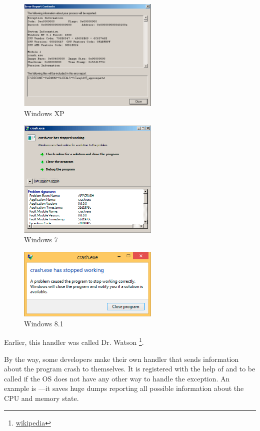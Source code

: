 \begin{figure}[H]
\centering
\includegraphics[width=0.6\textwidth]{OS/SEH/1/crash_xp2.png}
\caption{Windows XP}
\end{figure}

\begin{figure}[H]
\centering
\includegraphics[width=0.6\textwidth]{OS/SEH/1/crash_win7.png}
\caption{Windows 7}
\end{figure}

\begin{figure}[H]
\centering
\includegraphics[width=0.6\textwidth]{OS/SEH/1/crash_win81.png}
\caption{Windows 8.1}
\end{figure}

Earlier, this handler was called Dr. Watson
\footnote{\href{http://go.yurichev.com/17046}{wikipedia}}.

By the way, some developers make their own handler that sends information about the program crash to themselves.
It is registered with the help of  
and to be called if the \ac{OS} does not have any other way to handle the exception.
\myindex{\oracle}
An example is \oracle---it saves huge dumps reporting all possible information about the \ac{CPU} and memory state.

